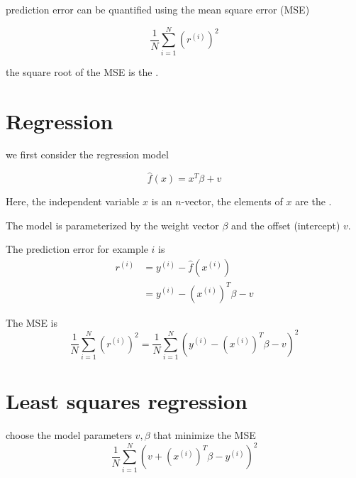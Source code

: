 prediction error can be quantified using the mean square error (MSE)

\begin{definition}
    $$
\frac{1}{N} \sum_{i=1}^{N}\left(r^{(i)}\right)^{2}
$$
\end{definition}

the square root of the MSE is the .

\section{Regression}

we first consider the regression model

\begin{problem}
    $$
    \hat{f}(x)=x^{T} \beta+v
    $$ 

    Here, the independent variable $ x $ is an $ n $-vector, the elements of $ x $ are the .
    
\end{problem}

The model is parameterized by the weight vector $ \beta $ and the offset (intercept) $ v $.

\begin{theorem}
    The prediction error for example $ i $ is
$$
\begin{aligned}
r^{(i)} &=y^{(i)}-\hat{f}\left(x^{(i)}\right) \\
&=y^{(i)}-\left(x^{(i)}\right)^{T} \beta-v
\end{aligned}
$$
\end{theorem}

\begin{theorem}
    The MSE is
$$
\frac{1}{N} \sum_{i=1}^{N}\left(r^{(i)}\right)^{2}=\frac{1}{N} \sum_{i=1}^{N}\left(y^{(i)}-\left(x^{(i)}\right)^{T} \beta-v\right)^{2}
$$
\end{theorem}


\section{Least squares regression}

\begin{problem}
    choose the model parameters $ v, \beta $ that minimize the MSE
    $$
    \frac{1}{N} \sum_{i=1}^{N}\left(v+\left(x^{(i)}\right)^{T} \beta-y^{(i)}\right)^{2}
    $$

\end{problem}


